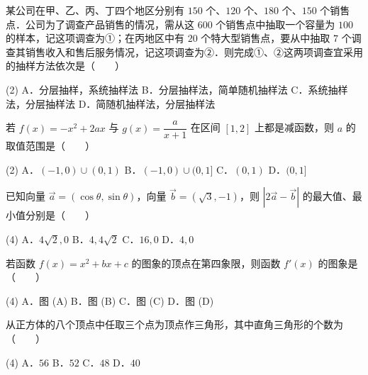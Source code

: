 \begin{question}
某公司在甲、乙、丙、丁四个地区分别有 $150$ 个、$120$ 个、$180$ 个、$150$ 个销售点．公司为了调查产品销售的情况，需从这 $600$ 个销售点中抽取一个容量为 $100$ 的样本，记这项调查为①；在丙地区中有 $20$ 个特大型销售点，要从中抽取 $7$ 个调查其销售收入和售后服务情况，记这项调查为②．则完成①、②这两项调查宜采用的抽样方法依次是\mbox{（　　）}

\begin{gkopts}(2)
\task A．分层抽样，系统抽样法
\task B．分层抽样法，简单随机抽样法
\task C．系统抽样法，分层抽样法
\task D．简随机抽样法，分层抽样法
\end{gkopts}

\end{question}
\begin{question}
若 $f(x) = -x^2 + 2ax$ 与 $g(x) = \dfrac{a}{x + 1}$ 在区间 $[1, 2]$ 上都是减函数，则 $a$ 的取值范围是\mbox{（　　）}

\begin{gkopts}(2)
\task A．$(-1, 0) \cup (0, 1)$
\task B．$(-1, 0) \cup (0, 1]$
\task C．$(0, 1)$
\task D．$(0, 1]$
\end{gkopts}

\end{question}
\begin{question}
已知向量 $\vec{a} = (\cos\theta, \sin\theta)$，向量 $\vec{b} = (\sqrt{3}, -1)$，则 $|2\vec{a} - \vec{b}|$ 的最大值、最小值分别是\mbox{（　　）}

\begin{gkopts}(4)
\task A．$4\sqrt{2}, 0$
\task B．$4, 4\sqrt{2}$
\task C．$16, 0$
\task D．$4, 0$
\end{gkopts}

\Needspace{0.4\textheight}
\end{question}
\begin{question}
若函数 $f(x) = x^2 + bx + c$ 的图象的顶点在第四象限，则函数 $f'(x)$ 的图象是\mbox{（　　）}
\nopagebreak[4]
\begin{center}\end{center}
\nopagebreak[4]
\begin{gkopts}(4)
\task A．图 (A)
\task B．图 (B)
\task C．图 (C)
\task D．图 (D)
\end{gkopts}

\end{question}
\begin{question}
从正方体的八个顶点中任取三个点为顶点作三角形，其中直角三角形的个数为\mbox{（　　）}

\begin{gkopts}(4)
\task A．$56$
\task B．$52$
\task C．$48$
\task D．$40$
\end{gkopts}

\end{question}
